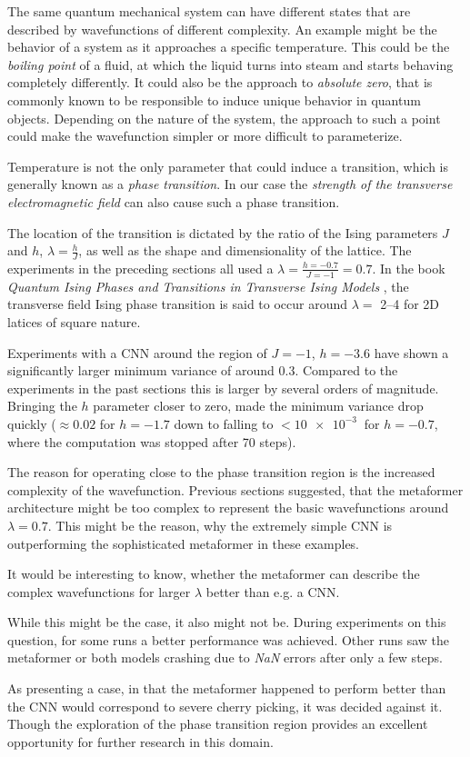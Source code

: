 The same quantum mechanical system can have different states that are described by wavefunctions of different complexity.
An example might be the behavior of a system as it approaches a specific temperature.
This could be the \emph{boiling point} of a fluid, at which the liquid turns into steam and starts behaving completely differently.
It could also be the approach to \emph{absolute zero}, that is commonly known to be responsible to induce unique behavior in quantum objects.
Depending on the nature of the system, the approach to such a point could make the wavefunction simpler or more difficult to parameterize.

Temperature is not the only parameter that could induce a transition, which is generally known as a \emph{phase transition}.
In our case the \emph{strength of the transverse electromagnetic field} can also cause such a phase transition.

The location of the transition is dictated by the ratio of the Ising parameters $J$ and $h$, $\lambda = \frac{h}{J}$, as well as the shape and dimensionality of the lattice.
The experiments in the preceding sections all used a $\lambda = \frac{h=-0.7}{J=-1} = 0.7$.
In the book \emph{Quantum Ising Phases and Transitions in Transverse Ising Models} \cite{isingBook}, the transverse field Ising phase transition is said to occur around $\lambda = $ \SIrange[]{2}{4}{} for 2D latices of square nature.

Experiments with a CNN around the region of $J = -1$, $h = -3.6$ have shown a significantly larger minimum variance of around \SI[]{0.3}[]{}. 
Compared to the experiments in the past sections this is larger by several orders of magnitude.
Bringing the $h$ parameter closer to zero, made the minimum variance drop quickly ($\approx 0.02$ for $h = -1.7$ down to falling to $< \SI[]{10e-3}[]{}$ for $h = -0.7$, where the computation was stopped after 70 steps).

The reason for operating close to the phase transition region is the increased complexity of the wavefunction.
Previous sections suggested, that the metaformer architecture might be too \glqq complex\grqq{} to represent the basic wavefunctions around $\lambda = 0.7$. 
This might be the reason, why the extremely simple CNN is outperforming the sophisticated metaformer in these examples.

It would be interesting to know, whether the metaformer can describe the complex wavefunctions for larger $\lambda$ better than e.g. a CNN.

While this might be the case, it also might not be.
During experiments on this question, for some runs a better performance was achieved. 
Other runs saw the metaformer or both models crashing due to \emph{NaN} errors after only a few steps.

As presenting a case, in that the metaformer happened to perform better than the CNN would correspond to severe cherry picking, it was decided against it.
Though the exploration of the phase transition region provides an excellent opportunity for further research in this domain.
